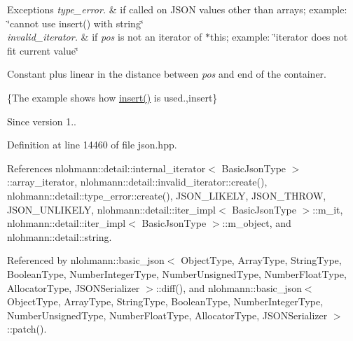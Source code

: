 \begin{DoxyExceptions}{Exceptions}
{\em type\+\_\+error.} & if called on J\+S\+ON values other than arrays; example\+: {\ttfamily \char`\"{}cannot use insert() with string\char`\"{}} \\
\hline
{\em invalid\+\_\+iterator.} & if {\itshape pos} is not an iterator of $\ast$this; example\+: {\ttfamily \char`\"{}iterator does not fit current value\char`\"{}}\\
\hline
\end{DoxyExceptions}
Constant plus linear in the distance between {\itshape pos} and end of the container.

\{The example shows how {\ttfamily \hyperlink{classnlohmann_1_1basic__json_a0136728f5db69d4051c77b94307abd6c}{insert()}} is used.,insert\}

\begin{DoxySince}{Since}
version 1.. 
\end{DoxySince}


Definition at line 14460 of file json.\+hpp.



References nlohmann\+::detail\+::internal\+\_\+iterator$<$ Basic\+Json\+Type $>$\+::array\+\_\+iterator, nlohmann\+::detail\+::invalid\+\_\+iterator\+::create(), nlohmann\+::detail\+::type\+\_\+error\+::create(), J\+S\+O\+N\+\_\+\+L\+I\+K\+E\+LY, J\+S\+O\+N\+\_\+\+T\+H\+R\+OW, J\+S\+O\+N\+\_\+\+U\+N\+L\+I\+K\+E\+LY, nlohmann\+::detail\+::iter\+\_\+impl$<$ Basic\+Json\+Type $>$\+::m\+\_\+it, nlohmann\+::detail\+::iter\+\_\+impl$<$ Basic\+Json\+Type $>$\+::m\+\_\+object, and nlohmann\+::detail\+::string.



Referenced by nlohmann\+::basic\+\_\+json$<$ Object\+Type, Array\+Type, String\+Type, Boolean\+Type, Number\+Integer\+Type, Number\+Unsigned\+Type, Number\+Float\+Type, Allocator\+Type, J\+S\+O\+N\+Serializer $>$\+::diff(), and nlohmann\+::basic\+\_\+json$<$ Object\+Type, Array\+Type, String\+Type, Boolean\+Type, Number\+Integer\+Type, Number\+Unsigned\+Type, Number\+Float\+Type, Allocator\+Type, J\+S\+O\+N\+Serializer $>$\+::patch().


